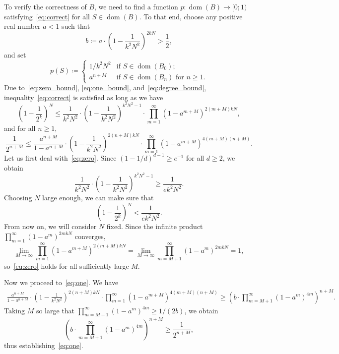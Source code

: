 \documentclass[12pt]{amsart}
\theoremstyle{definition}
\theoremstyle{remark}
\newcommand{\0}{\emptyset}
\newcommand{\dom}{\operatorname{dom}}
\numberwithin{equation}{section}
\begin{document}
	To verify the correctness of ${B}$, we need to find a function $p \colon\dom({B}) \to [0;1)$ satisfying~\eqref{eq:correct} for all $S \in \dom({B})$. To that end, choose any positive real number $a < 1$ such that
	$$
		b \coloneqq a \cdot \left(1 - \frac{1}{k^2N^2}\right)^{2kN} > \frac{1}{2},
	$$
	and set
	$$
		p(S) \coloneqq \begin{cases}
			1/k^2 N^2  &\text{if }S \in \dom(B_0);\\
			a^{n + M} &\text{if } S \in \dom(B_n) \text{ for } n\geq 1.
		\end{cases}
	$$
	Due to~\eqref{eq:zero_bound}, \eqref{eq:one_bound}, and~\eqref{eq:degree_bound}, inequality~\eqref{eq:correct} is satisfied as long as we have
	\begin{equation}
	\label{eq:zero}
		\left(1 - \frac{1}{2^{k}}\right)^N \leq \frac{1}{k^2 N^2} \cdot \left(1 - \frac{1}{k^2 N^2}\right)^{k^2 N^2-1} \cdot \prod_{m = 1}^\infty (1 - a^{m+M})^{2(m+M)kN},
	\end{equation}
	and for all $n \geq 1$,
	\begin{equation}\label{eq:one}
		\frac{1}{2^{n + M}} \leq \frac{a^{n+M}}{1 - a^{n + M}} \cdot \left(1 - \frac{1}{k^2N^2}\right)^{2(n+M)kN}\cdot \prod_{m = 1}^\infty (1 - a^{m+ M})^{4(m+M)(n+M)}.
	\end{equation}
	Let us first deal with~\eqref{eq:zero}. Since $(1 - 1/d)^{d-1} \geq e^{-1}$ for all $d \geq 2$, we obtain
	$$
		\frac{1}{k^2 N^2} \cdot \left(1 - \frac{1}{k^2 N^2}\right)^{k^2 N^2-1} \geq \frac{1}{ek^2 N^2}.
	$$
	Choosing $N$ large enough, we can make sure that
	$$
		\left(1 - \frac{1}{2^{k}}\right)^N < \frac{1}{ek^2 N^2}.
	$$
	From now on, we will consider $N$ fixed. Since the infinite product $\prod_{m=1}^\infty(1 - a^m)^{2mkN}$ converges,
	$$
		\lim_{M \to \infty}\prod_{m = 1}^\infty (1 - a^{m+M})^{2(m+M)kN} = \lim_{M \to \infty} \prod_{m = M+ 1}^\infty (1 - a^m)^{2mkN} = 1,
	$$
	so~\eqref{eq:zero} holds for all sufficiently large $M$.
	
	Now we proceed to~\eqref{eq:one}. We have
	\begin{align*}
		\frac{a^{n+M}}{1 - a^{n + M}} \cdot \left(1 - \frac{1}{k^2N^2}\right)^{2(n+M)kN}\cdot \prod_{m = 1}^\infty (1 - a^{m+ M})^{4(m+M)(n+M)} 
		\geq \left(b \cdot \prod_{m = M+1}^\infty (1 - a^{m})^{4m} \right)^{n+ M}.
	\end{align*}
	Taking $M$ so large that $\prod_{m = M+1}^\infty (1 - a^m)^{4m} \geq 1/(2b)$, we obtain
	$$
		\left(b \cdot \prod_{m = M+1}^\infty (1 - a^{m})^{4m} \right)^{n+ M} \geq \frac{1}{2^{n+M}},
	$$
	thus establishing~\eqref{eq:one}.
	
\end{document}
